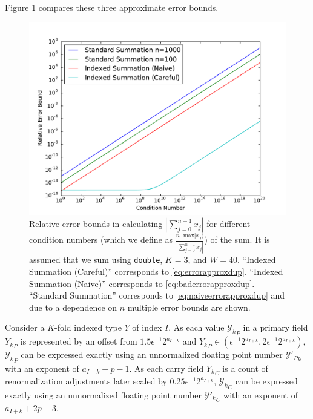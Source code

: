 \documentclass[12pt]{article}
\providecommand{\max}{\ensuremath{\text{max}}}
\theoremstyle{definition}
\numberwithin{equation}{section}
\numberwithin{figure}{section}
\begin{document}
    Figure \ref{fig:conversionmotivation} compares these three approximate error bounds.

\begin{figure}[H]
\begin{center}
\includegraphics[width=\textwidth]{plots/errorcomparison.pdf}
\caption{Relative error bounds in calculating $|\sum \limits_{j = 0}^{n - 1} x_j|$ for different condition numbers (which we define as $\frac{n \cdot \max |x_j)}{|\sum \limits_{j = 0}^{n - 1} x_j|}$) of the sum. It is assumed that we sum using \texttt{double}, $K = 3$, and $W = 40$. ``Indexed Summation (Careful)'' corresponds to \eqref{eq:errorapproxdup}. ``Indexed Summation (Naive)'' corresponds to \eqref{eq:baderrorapproxdup}. ``Standard Summation'' corresponds to \eqref{eq:naiveerrorapproxdup} and due to a dependence on $n$ multiple error bounds are shown.}
\label{fig:conversionmotivation}
\end{center}
\end{figure}

    Consider a $K$-fold indexed type $Y$ of index $I$.
    As each value ${\mathcal{Y}_k}_P$ in a primary field ${Y_k}_P$ is represented by an offset from $1.5  \epsilon^{-1}  2^{a_{I + k}}$ and ${Y_k}_P \in (\epsilon^{-1}  2^{a_{I + k}}, 2  \epsilon^{-1}  2^{a_{I + k}})$, ${\mathcal{Y}_k}_P$ can be expressed exactly using an unnormalized floating point number ${\mathcal{Y}'_P}_k$ with an exponent of $a_{I + k} + p - 1$.
    As each carry field ${Y_k}_C$ is a count of renormalization adjustments later scaled by $0.25  \epsilon^{-1}  2^{a_{I + k}}$, ${\mathcal{Y}_k}_C$ can be expressed exactly using an unnormalized floating point number ${\mathcal{Y}'_k}_C$ with an exponent of $a_{I + k} + 2  p - 3$.
\end{document}
